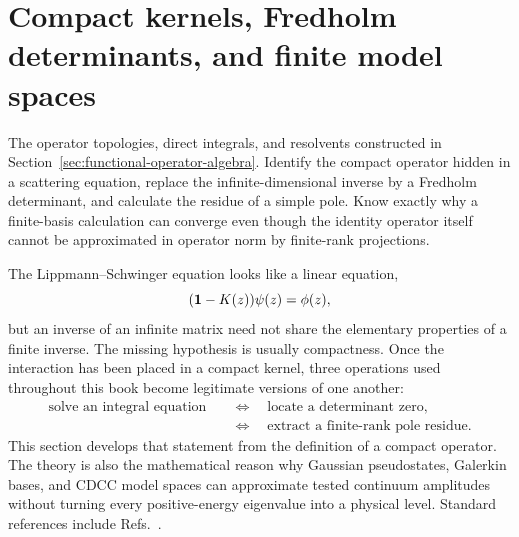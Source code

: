 \section{Compact kernels, Fredholm determinants, and finite model spaces}
\label{sec:hilbert-schmidt-fredholm}

\calculationroute
  {The operator topologies, direct integrals, and resolvents constructed in
  Section~\ref{sec:functional-operator-algebra}.}
  {Identify the compact operator hidden in a scattering equation, replace
  the infinite-dimensional inverse by a Fredholm determinant, and calculate
  the residue of a simple pole.}
  {Know exactly why a finite-basis calculation can converge even though the
  identity operator itself cannot be approximated in operator norm by
  finite-rank projections.}

The Lippmann--Schwinger equation looks like a linear equation,
\begin{equation}
  (\mathbf{1}-K(z))\psi(z)=\phi(z),
  \label{eq:fredholm-start}
\end{equation}
but an inverse of an infinite matrix need not share the elementary properties
of a finite inverse.  The missing hypothesis is usually compactness.  Once
the interaction has been placed in a compact kernel, three operations used
throughout this book become legitimate versions of one another:
\begin{equation}
  \begin{aligned}
    \text{solve an integral equation}
    &\quad\Longleftrightarrow\quad
    \text{locate a determinant zero},\\
    &\quad\Longleftrightarrow\quad
    \text{extract a finite-rank pole residue}.
  \end{aligned}
  \label{eq:fredholm-three-operations}
\end{equation}
This section develops that statement from the definition of a compact
operator.  The theory is also the mathematical reason why Gaussian
pseudostates, Galerkin bases, and CDCC model spaces can approximate tested
continuum amplitudes without turning every positive-energy eigenvalue into a
physical level.  Standard references include
Refs.~\cite{Kato:1995,SimonTraceIdeals:2005,Kukulin:1989}.

